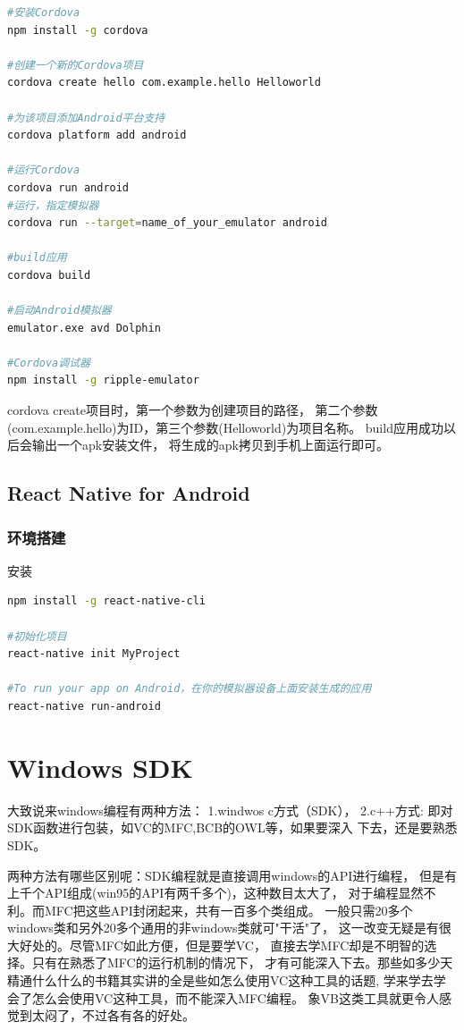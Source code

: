 \documentclass{book}
\begin{document}
\begin{lstlisting}[language=Bash]
#安装Cordova
npm install -g cordova

#创建一个新的Cordova项目
cordova create hello com.example.hello Helloworld

#为该项目添加Android平台支持
cordova platform add android

#运行Cordova
cordova run android
#运行，指定模拟器
cordova run --target=name_of_your_emulator android

#build应用
cordova build

#启动Android模拟器
emulator.exe avd Dolphin

#Cordova调试器
npm install -g ripple-emulator
\end{lstlisting}

cordova create项目时，第一个参数为创建项目的路径，
第二个参数(com.example.hello)为ID，第三个参数(Helloworld)为项目名称。
build应用成功以后会输出一个apk安装文件，
将生成的apk拷贝到手机上面运行即可。

\section{React Native for Android}

\subsection{环境搭建}

安装

\begin{lstlisting}[language=Bash]
npm install -g react-native-cli

#初始化项目
react-native init MyProject

#To run your app on Android，在你的模拟器设备上面安装生成的应用
react-native run-android
\end{lstlisting}

\chapter{Windows SDK}

大致说来windows编程有两种方法： 1.windwos c方式（SDK）， 2.c++方式:
即对SDK函数进行包装，如VC的MFC,BCB的OWL等，如果要深入 下去，还是要熟悉SDK。

两种方法有哪些区别呢：SDK编程就是直接调用windows的API进行编程，
但是有上千个API组成(win95的API有两千多个)，这种数目太大了，
对于编程显然不利。而MFC把这些API封闭起来，共有一百多个类组成。
一般只需20多个windows类和另外20多个通用的非windows类就可"干活"了，
这一改变无疑是有很大好处的。尽管MFC如此方便，但是要学VC，
直接去学MFC却是不明智的选择。只有在熟悉了MFC的运行机制的情况下，
才有可能深入下去。那些如多少天精通什么什么的书籍其实讲的全是些如怎么使用VC这种工具的话题,
学来学去学会了怎么会使用VC这种工具，而不能深入MFC编程。
象VB这类工具就更令人感觉到太闷了，不过各有各的好处。
\end{document}
